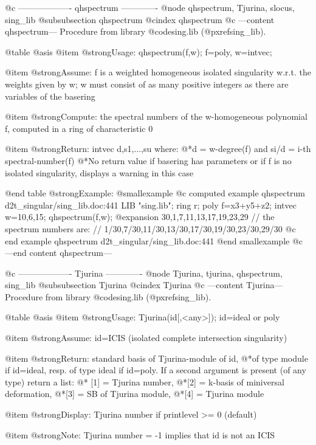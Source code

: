 @c ------------------- qhspectrum -------------
@node qhspectrum, Tjurina, slocus, sing_lib
@subsubsection qhspectrum
@cindex qhspectrum
@c ---content qhspectrum---
Procedure from library @code{sing.lib} (@pxref{sing_lib}).

@table @asis
@item @strong{Usage:}
qhspectrum(f,w); f=poly, w=intvec;

@item @strong{Assume:}
f is a weighted homogeneous isolated singularity w.r.t. the weights
given by w; w must consist of as many positive integers as there
are variables of the basering

@item @strong{Compute:}
the spectral numbers of the w-homogeneous polynomial f, computed in a
ring of characteristic 0

@item @strong{Return:}
intvec d,s1,...,su where:
@*d = w-degree(f) and si/d = i-th spectral-number(f)
@*No return value if basering has parameters or if f is no isolated
singularity, displays a warning in this case

@end table
@strong{Example:}
@smallexample
@c computed example qhspectrum d2t_singular/sing_lib.doc:441 
LIB "sing.lib";
ring r;
poly f=x3+y5+z2;
intvec w=10,6,15;
qhspectrum(f,w);
@expansion{} 30,1,7,11,13,17,19,23,29
// the spectrum numbers are:
// 1/30,7/30,11/30,13/30,17/30,19/30,23/30,29/30
@c end example qhspectrum d2t_singular/sing_lib.doc:441
@end smallexample
@c ---end content qhspectrum---

@c ------------------- Tjurina -------------
@node Tjurina, tjurina, qhspectrum, sing_lib
@subsubsection Tjurina
@cindex Tjurina
@c ---content Tjurina---
Procedure from library @code{sing.lib} (@pxref{sing_lib}).

@table @asis
@item @strong{Usage:}
Tjurina(id[,<any>]); id=ideal or poly

@item @strong{Assume:}
id=ICIS (isolated complete intersection singularity)

@item @strong{Return:}
standard basis of Tjurina-module of id,
@*of type module if id=ideal, resp. of type ideal if id=poly.
If a second argument is present (of any type) return a list: @*
[1] = Tjurina number,
@*[2] = k-basis of miniversal deformation,
@*[3] = SB of Tjurina module,
@*[4] = Tjurina module

@item @strong{Display:}
Tjurina number if printlevel >= 0 (default)

@item @strong{Note:}
Tjurina number = -1 implies that id is not an ICIS

